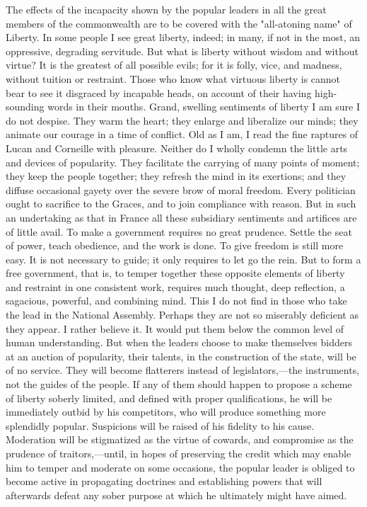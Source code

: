 The effects of the incapacity shown by the popular leaders in all the great members of the commonwealth are to be covered with the "all-atoning name" of Liberty. In some people I see great liberty, indeed; in many, if not in the most, an oppressive, degrading servitude. But what is liberty without wisdom and without virtue? It is the greatest of all possible evils; for it is folly, vice, and madness, without tuition or restraint. Those who know what virtuous liberty is cannot bear to see it disgraced by incapable heads, on account of their having high-sounding words in their mouths. Grand, swelling sentiments of liberty I am sure I do not despise. They warm the heart; they enlarge and liberalize our minds; they animate our courage in a time of conflict. Old as I am, I read the fine raptures of Lucan and Corneille with pleasure. Neither do I wholly condemn the little arts and devices of popularity. They facilitate the carrying of many points of moment; they keep the people together; they refresh the mind in its exertions; and they diffuse occasional gayety over the severe brow of moral freedom. Every politician ought to sacrifice to the Graces, and to join compliance with reason. But in such an undertaking as that in France all these subsidiary sentiments and artifices are of little avail. To make a government requires no great prudence. Settle the seat of power, teach obedience, and the work is done. To give freedom is still more easy. It is not necessary to guide; it only requires to let go the rein. But to form a free government, that is, to temper together these opposite elements of liberty and restraint in one consistent work, requires much thought, deep reflection, a sagacious, powerful, and combining mind. This I do not find in those who take the lead in the National Assembly. Perhaps they are not so miserably deficient as they appear. I rather believe it. It would put them below the common level of human understanding. But when the leaders choose to make themselves bidders at an auction of popularity, their talents, in the construction of the state, will be of no service. They will become flatterers instead of legislators,—the instruments, not the guides of the people. If any of them should happen to propose a scheme of liberty soberly limited, and defined with proper qualifications, he will be immediately outbid by his competitors, who will produce something more splendidly popular. Suspicions will be raised of his fidelity to his cause. Moderation will be stigmatized as the virtue of cowards, and compromise as the prudence of traitors,—until, in hopes of preserving the credit which may enable him to temper and moderate on some occasions, the popular leader is obliged to become active in propagating doctrines and establishing powers that will afterwards defeat any sober purpose at which he ultimately might have aimed.

